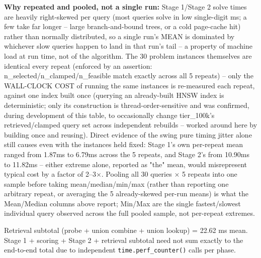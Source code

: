 \begin{table}[t]
\begin{threeparttable}
\begin{tablenotes}
\item[b] \textbf{Why repeated and pooled, not a single run:} Stage 1/Stage 2 solve times are heavily right-skewed per query (most queries solve in low single-digit ms; a few take far longer -- large branch-and-bound trees, or a cold page-cache hit) rather than normally distributed, so a single run's MEAN is dominated by whichever slow queries happen to land in that run's tail -- a property of machine load at run time, not of the algorithm. The 30 problem instances themselves are identical every repeat (enforced by an assertion: n\_selected/n\_clamped/n\_feasible match exactly across all 5 repeats) -- only the WALL-CLOCK COST of running the same instances is re-measured each repeat, against one index built once (querying an already-built HNSW index is deterministic; only its construction is thread-order-sensitive and was confirmed, during development of this table, to occasionally change tier\_100k's retrieved/clamped query set across independent rebuilds -- worked around here by building once and reusing). Direct evidence of the swing pure timing jitter alone still causes even with the instances held fixed: Stage 1's own per-repeat mean ranged from 1.87ms to 6.79ms across the 5 repeats, and Stage 2's from 10.90ms to 11.82ms -- either extreme alone, reported as "the" mean, would misrepresent typical cost by a factor of 2--3$\times$. Pooling all 30 queries $\times$ 5 repeats into one sample before taking mean/median/min/max (rather than reporting one arbitrary repeat, or averaging the 5 already-skewed per-run means) is what the Mean/Median columns above report; Min/Max are the single fastest/slowest individual query observed across the full pooled sample, not per-repeat extremes.
\item[c] Retrieval subtotal (probe + union combine + union lookup) = 22.62 ms mean. Stage 1 + scoring + Stage 2 + retrieval subtotal need not sum exactly to the end-to-end total due to independent \texttt{time.perf\_counter()} calls per phase.
\end{tablenotes}
\end{threeparttable}
\end{table}

